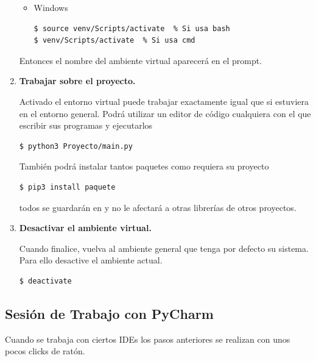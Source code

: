 \begin{enumerate}
\begin{itemize}
\item Windows

\begin{Verbatim}
$ source venv/Scripts/activate  % Si usa bash
$ venv/Scripts/activate  % Si usa cmd
\end{Verbatim}
\end{itemize}

Entonces el nombre del ambiente virtual aparecerá en el prompt. 


\item \textbf{Trabajar sobre el proyecto.} 

Activado el entorno virtual puede trabajar exactamente igual que si estuviera en el entorno general. Podrá utilizar un editor de código cualquiera con el que escribir sus programas y ejecutarlos
\begin{Verbatim}
$ python3 Proyecto/main.py
\end{Verbatim}

También podrá instalar tantos paquetes como requiera su proyecto 
\begin{Verbatim}
$ pip3 install paquete
\end{Verbatim}
todos se guardarán en  y no le afectará a otras librerías de otros proyectos.

\item \textbf{Desactivar el ambiente virtual.} 

Cuando finalice, vuelva al ambiente  general que tenga por defecto su sistema. Para ello desactive el ambiente actual.
\begin{Verbatim}
$ deactivate
\end{Verbatim}

\end{enumerate}




\subsection{Sesión de Trabajo con PyCharm} \label{subsec:SesionPyCharm}
Cuando se trabaja con ciertos IDEs los pasos anteriores se realizan con unos pocos clicks de ratón.


